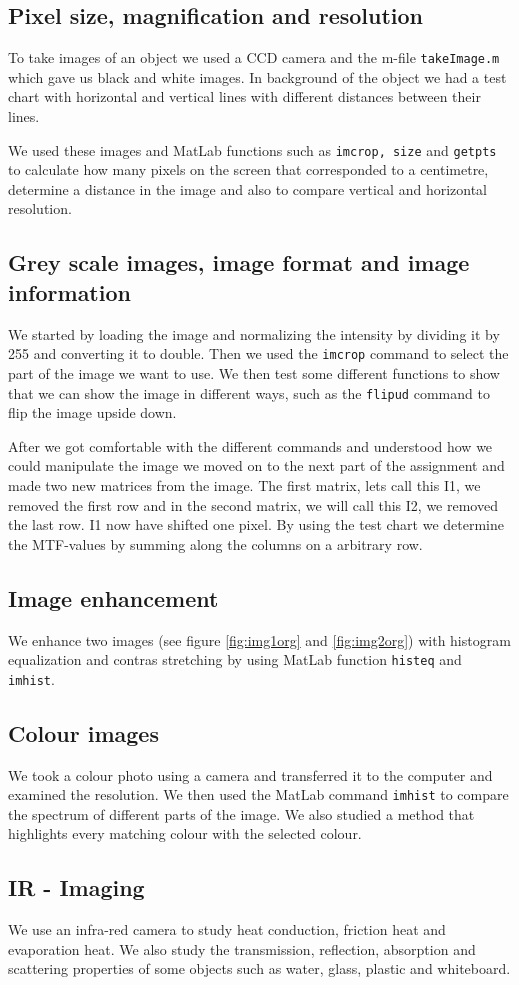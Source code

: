 \subsection{Pixel size, magnification and resolution}
To take images of an object we used a CCD camera and the m-file \texttt{takeImage.m} which gave us black and white images. In background of the object we had a test chart with horizontal and vertical lines with different distances between their lines. 

We used these images and MatLab functions such as \texttt{imcrop, size} and \texttt{getpts} to calculate how many pixels on the screen that corresponded to a centimetre, determine a distance in the image and also to compare vertical and horizontal resolution. 

\subsection{Grey scale images, image format and image information}
We started by loading the image and normalizing the intensity by dividing it by 255 and converting it to double. Then we used the \texttt{imcrop} command to select the part of the image we want to use. We then test some different functions to show that we can show the image in different ways, such as the \texttt{flipud} command to flip the image upside down. 

After we got comfortable with the different commands and understood how we could manipulate the image we moved on to the next part of the assignment and made two new matrices from the image. The first matrix, lets call this I1, we removed the first row and in the second matrix, we will call this I2, we removed the last row. I1 now have shifted one pixel.
By using the test chart we determine the MTF-values by summing along the columns on a arbitrary row.

\subsection{Image enhancement}
We enhance two images (see figure \ref{fig:img1org} and \ref{fig:img2org}) with histogram equalization and contras stretching by using MatLab function \texttt{histeq} and \texttt{imhist}. 

\subsection{Colour images}
We took a colour photo using a camera and transferred it to the computer and examined the resolution. We then used the MatLab command \texttt{imhist} to compare the spectrum of different parts of the image. %
We also studied a method that highlights every matching colour with the selected colour.

\subsection{IR - Imaging}
We use an infra-red camera to study heat conduction, friction heat and evaporation heat. We also study the transmission, reflection, absorption and scattering properties of some objects such as water, glass, plastic and whiteboard.